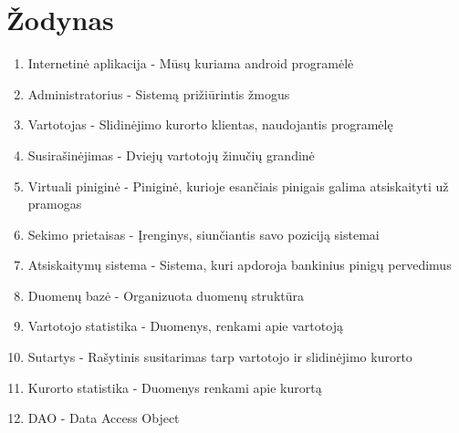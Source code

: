 \documentclass[oneside]{VUMIFPSkursinis}
\begin{document}
\section{Žodynas}
\begin{enumerate}
	\item Internetinė aplikacija - Mūsų kuriama android programėlė
	\item Administratorius - Sistemą prižiūrintis žmogus
	\item Vartotojas - Slidinėjimo kurorto klientas, naudojantis programėlę
	\item Susirašinėjimas - Dviejų vartotojų žinučių grandinė
	\item Virtuali piniginė - Piniginė, kurioje esančiais pinigais galima atsiskaityti už pramogas
	\item Sekimo prietaisas - Įrenginys, siunčiantis savo poziciją sistemai
	\item Atsiskaitymų sistema - Sistema, kuri apdoroja bankinius pinigų pervedimus
	\item Duomenų bazė - Organizuota duomenų struktūra
	\item Vartotojo statistika - Duomenys, renkami apie vartotoją
	\item Sutartys - Rašytinis susitarimas tarp vartotojo ir slidinėjimo kurorto
	\item Kurorto statistika - Duomenys renkami apie kurortą
	\item DAO - Data Access Object
\end{enumerate}
\end{document}
